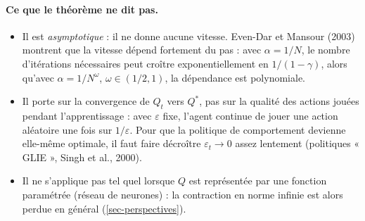 \paragraph{Ce que le théorème ne dit pas.}
\begin{itemize}
\item Il est \emph{asymptotique} : il ne donne aucune vitesse. Even-Dar et Mansour (2003) montrent que la vitesse dépend fortement du pas : avec $\alpha=1/N$, le nombre d'itérations nécessaires peut croître exponentiellement en $1/(1-\gamma)$, alors qu'avec $\alpha=1/N^\omega$, $\omega\in(1/2,1)$, la dépendance est polynomiale.
\item Il porte sur la convergence de $Q_t$ vers $Q^*$, pas sur la qualité des actions jouées pendant l'apprentissage : avec $\varepsilon$ fixe, l'agent continue de jouer une action aléatoire une fois sur $1/\varepsilon$. Pour que la politique de comportement devienne elle-même optimale, il faut faire décroître $\varepsilon_t\to0$ assez lentement (politiques « GLIE », Singh et al., 2000).
\item Il ne s'applique pas tel quel lorsque $Q$ est représentée par une fonction paramétrée (réseau de neurones) : la contraction en norme infinie est alors perdue en général (\cref{sec-perspectives}).
\end{itemize}
